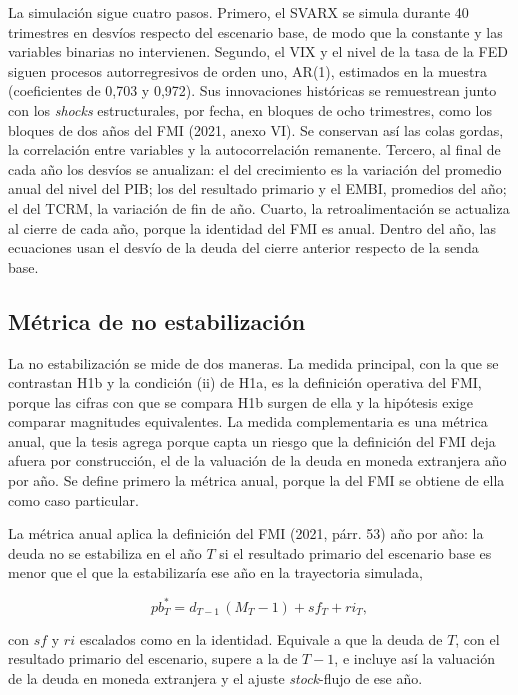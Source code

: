La simulación sigue cuatro pasos. Primero, el SVARX se simula durante 40
trimestres en desvíos respecto del escenario base, de modo que la
constante y las variables binarias no intervienen. Segundo, el VIX y el
nivel de la tasa de la FED siguen procesos autorregresivos de orden uno,
AR(1), estimados en la muestra (coeficientes de 0,703 y 0,972). Sus
innovaciones históricas se remuestrean junto con los \emph{shocks}
estructurales, por fecha, en bloques de ocho trimestres, como los
bloques de dos años del FMI (2021, anexo VI). Se conservan así las colas
gordas, la correlación entre variables y la autocorrelación remanente.
Tercero, al final de cada año los desvíos se anualizan: el del
crecimiento es la variación del promedio anual del nivel del PIB; los
del resultado primario y el EMBI, promedios del año; el del TCRM, la
variación de fin de año. Cuarto, la retroalimentación se actualiza al
cierre de cada año, porque la identidad del FMI es anual. Dentro del
año, las ecuaciones usan el desvío de la deuda del cierre anterior
respecto de la senda base.

\subsection{Métrica de no estabilización}

La no estabilización se mide de dos maneras. La medida principal, con la
que se contrastan H1b y la condición (ii) de H1a, es la definición
operativa del FMI, porque las cifras con que se compara H1b surgen de
ella y la hipótesis exige comparar magnitudes equivalentes. La medida
complementaria es una métrica anual, que la tesis agrega porque capta un
riesgo que la definición del FMI deja afuera por construcción, el de la
valuación de la deuda en moneda extranjera año por año. Se define
primero la métrica anual, porque la del FMI se obtiene de ella como caso
particular.

La métrica anual aplica la definición del FMI (2021, párr. 53) año por
año: la deuda no se estabiliza en el año \(T\) si el resultado primario
del escenario base es menor que el que la estabilizaría ese año en la
trayectoria simulada,

\[pb^*_T = d_{T-1}\,(M_T - 1) + sf_T + ri_T,\]

con \(sf\) y \(ri\) escalados como en la identidad. Equivale a que la
deuda de \(T\), con el resultado primario del escenario, supere a la de
\(T-1\), e incluye así la valuación de la deuda en moneda extranjera y
el ajuste \emph{stock}-flujo de ese año.

